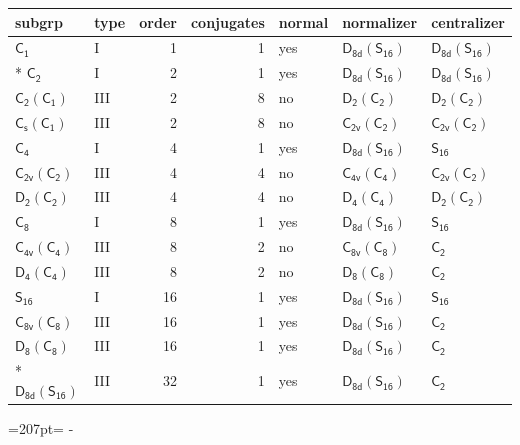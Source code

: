 \documentclass[10pt,a4paper]{article}
\newcommand{\needspace}[1]{\par\penalty-100\begingroup\dimen0=#1\relax\dimen2=\pagegoal
  \advance\dimen2-\pagetotal\ifdim\dimen0>\dimen2\relax\ifdim\dimen2>0pt\vfil\break\fi\fi
  \endgroup}
\numberwithin{equation}{section}
\newcommand{\grp}[1]{\mathsf{#1}}
\begin{document}
{\small\begin{longtable}{@{}llrrlll@{}}\toprule
subgrp & type & order & conjugates & normal & normalizer & centralizer\\\midrule\endhead
\bottomrule\endfoot\endlastfoot
\href{../../../rotation/data/pdf/C1.pdf}{$\grp{C_{1}}$} & I & 1 & 1 & yes & \href{D8d-S16.pdf}{$\grp{D_{8d}}(\grp{S_{16}})$} & \href{D8d-S16.pdf}{$\grp{D_{8d}}(\grp{S_{16}})$}\\*
\href{../../../rotation/data/pdf/C2.pdf}{$\grp{C_{2}}$} & I & 2 & 1 & yes & \href{D8d-S16.pdf}{$\grp{D_{8d}}(\grp{S_{16}})$} & \href{D8d-S16.pdf}{$\grp{D_{8d}}(\grp{S_{16}})$}\\
\href{C2-C1.pdf}{$\grp{C_{2}}(\grp{C_{1}})$} & III & 2 & 8 & no & \href{D2-C2.pdf}{$\grp{D_{2}}(\grp{C_{2}})$} & \href{D2-C2.pdf}{$\grp{D_{2}}(\grp{C_{2}})$}\\
\href{C1v-C1.pdf}{$\grp{C_{s}}(\grp{C_{1}})$} & III & 2 & 8 & no & \href{C2v-C2.pdf}{$\grp{C_{2v}}(\grp{C_{2}})$} & \href{C2v-C2.pdf}{$\grp{C_{2v}}(\grp{C_{2}})$}\\
\href{../../../rotation/data/pdf/C4.pdf}{$\grp{C_{4}}$} & I & 4 & 1 & yes & \href{D8d-S16.pdf}{$\grp{D_{8d}}(\grp{S_{16}})$} & \href{../../../rotation/data/pdf/S16.pdf}{$\grp{S_{16}}$}\\
\href{C2v-C2.pdf}{$\grp{C_{2v}}(\grp{C_{2}})$} & III & 4 & 4 & no & \href{C4v-C4.pdf}{$\grp{C_{4v}}(\grp{C_{4}})$} & \href{C2v-C2.pdf}{$\grp{C_{2v}}(\grp{C_{2}})$}\\
\href{D2-C2.pdf}{$\grp{D_{2}}(\grp{C_{2}})$} & III & 4 & 4 & no & \href{D4-C4.pdf}{$\grp{D_{4}}(\grp{C_{4}})$} & \href{D2-C2.pdf}{$\grp{D_{2}}(\grp{C_{2}})$}\\
\href{../../../rotation/data/pdf/C8.pdf}{$\grp{C_{8}}$} & I & 8 & 1 & yes & \href{D8d-S16.pdf}{$\grp{D_{8d}}(\grp{S_{16}})$} & \href{../../../rotation/data/pdf/S16.pdf}{$\grp{S_{16}}$}\\
\href{C4v-C4.pdf}{$\grp{C_{4v}}(\grp{C_{4}})$} & III & 8 & 2 & no & \href{C8v-C8.pdf}{$\grp{C_{8v}}(\grp{C_{8}})$} & \href{../../../rotation/data/pdf/C2.pdf}{$\grp{C_{2}}$}\\
\href{D4-C4.pdf}{$\grp{D_{4}}(\grp{C_{4}})$} & III & 8 & 2 & no & \href{D8-C8.pdf}{$\grp{D_{8}}(\grp{C_{8}})$} & \href{../../../rotation/data/pdf/C2.pdf}{$\grp{C_{2}}$}\\
\href{../../../rotation/data/pdf/S16.pdf}{$\grp{S_{16}}$} & I & 16 & 1 & yes & \href{D8d-S16.pdf}{$\grp{D_{8d}}(\grp{S_{16}})$} & \href{../../../rotation/data/pdf/S16.pdf}{$\grp{S_{16}}$}\\
\href{C8v-C8.pdf}{$\grp{C_{8v}}(\grp{C_{8}})$} & III & 16 & 1 & yes & \href{D8d-S16.pdf}{$\grp{D_{8d}}(\grp{S_{16}})$} & \href{../../../rotation/data/pdf/C2.pdf}{$\grp{C_{2}}$}\\
\href{D8-C8.pdf}{$\grp{D_{8}}(\grp{C_{8}})$} & III & 16 & 1 & yes & \href{D8d-S16.pdf}{$\grp{D_{8d}}(\grp{S_{16}})$} & \href{../../../rotation/data/pdf/C2.pdf}{$\grp{C_{2}}$}\\*
\href{D8d-S16.pdf}{$\grp{D_{8d}}(\grp{S_{16}})$} & III & 32 & 1 & yes & \href{D8d-S16.pdf}{$\grp{D_{8d}}(\grp{S_{16}})$} & \href{../../../rotation/data/pdf/C2.pdf}{$\grp{C_{2}}$}\\
\bottomrule\end{longtable}}
\needspace{207pt}
\end{document}
